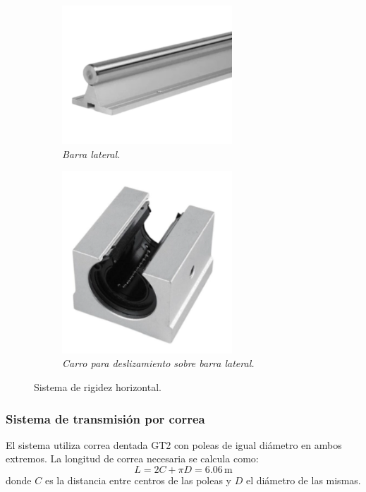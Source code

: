 \begin{figure}[H]
    \centering
    \begin{subfigure}{0.35\textwidth}
        \centering
        \includegraphics[width=0.7\textwidth]{img/barra_lateral.png}
        \caption{\textit{Barra lateral.}}
        \label{fig:barra_lateral}
    \end{subfigure}
    \hspace{0.5cm}
    \begin{subfigure}{0.35\textwidth}
        \centering
        \includegraphics[width=0.7\textwidth]{img/sbr20uu.png}
        \caption{\textit{Carro para deslizamiento sobre barra lateral.}}
        \label{fig:sbr20uu}
    \end{subfigure}
    \caption{Sistema de rigidez horizontal.}
\end{figure}


\subsubsection{Sistema de transmisión por correa}
El sistema utiliza correa dentada GT2 con poleas de igual diámetro en ambos extremos. La longitud de correa necesaria se calcula como:
\begin{equation}
L = 2C + \pi D = 6.06\,\text{m}
\label{eq:longitud_correa}
\end{equation}
donde $C$ es la distancia entre centros de las poleas y $D$ el diámetro de las mismas.

